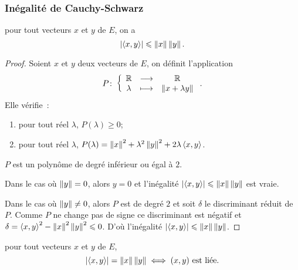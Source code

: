 \subsubsection{Inégalité de Cauchy-Schwarz}

\begin{theo}
  pour tout vecteurs \(x\) et \(y\) de \(E\), on a
  \begin{equation}
    \left\lvert\left\langle{x},{y}\right\rangle\right\rvert \leqslant \left\lVert x\right\rVert\left\lVert y\right\rVert.
  \end{equation}
\end{theo}
\begin{proof}
  Soient \(x\) et \(y\) deux vecteurs de \(E\), on définit l'application
  \begin{equation}
    P\colon \left\{\begin{array}{ccc} \mathbb{R} & \longrightarrow &\mathbb{R}\\ \lambda & \longmapsto & \left\lVert x+\lambda y\right\rVert \end{array} \right..
  \end{equation}
  Elle vérifie~:
  \begin{enumerate}
    \item pour tout réel \(\lambda\), \(P(\lambda)\geqslant 0\);
    \item pour tout réel \(\lambda\), \(P(\lambda) = \left\lVert x\right\rVert^2+\lambda^2\left\lVert y\right\rVert^2+2\lambda\left\langle{x},{y}\right\rangle\).
  \end{enumerate}
  \(P\) est un polynôme de degré inférieur ou égal à \(2\). 

  Dans le cas où \(\left\lVert y\right\rVert=0\), alors \(y=0\) et l'inégalité \(\left\lvert\left\langle{x},{y}\right\rangle\right\rvert \leqslant \left\lVert x\right\rVert\left\lVert y\right\rVert\) est vraie.

  Dans le cas où \(\left\lVert y\right\rVert\neq 0\), alors \(P\) est de degré \(2\) et soit \(\delta\) le discriminant réduit de \(P\). Comme \(P\) ne change pas de signe ce discriminant est négatif et \(\delta=\left\langle{x},{y}\right\rangle^2-\left\lVert x\right\rVert^2\left\lVert y\right\rVert^2\leqslant 0\). D'où l'inégalité \(\left\lvert\left\langle{x},{y}\right\rangle\right\rvert \leqslant \left\lVert x\right\rVert\left\lVert y\right\rVert\).
\end{proof}
%
\begin{prop}
  pour tout vecteurs \(x\) et \(y\) de \(E\),
  \begin{equation}
    \left\lvert\left\langle{x},{y}\right\rangle\right\rvert=\left\lVert x\right\rVert\left\lVert y\right\rVert \iff (x,y) \text{~est liée}.
  \end{equation}
\end{prop}
